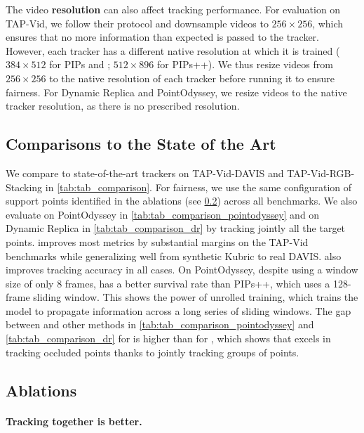The video \textbf{resolution} can also affect tracking performance.
For evaluation on TAP-Vid, we follow their protocol and downsample videos to $256\times 256$, which ensures that no more information than expected is passed to the tracker.
However, each tracker has a different native resolution at which it is trained ($384 \times 512$ for PIPs and \method; $512 \times 896$ for PIPs++).
We thus resize videos from $256\times 256$ to the native resolution of each tracker before running it to ensure fairness.
For Dynamic Replica and PointOdyssey, we resize videos to the native tracker resolution, as there is no prescribed resolution.




\subsection{Comparisons to the State of the Art}%
\label{sec:sota}

We compare \method to state-of-the-art trackers on TAP-Vid-DAVIS and TAP-Vid-RGB-Stacking in \cref{tab:tab_comparison}.
For fairness, we use the same configuration of support points identified in the ablations (see \cref{sec:ablations}) across all benchmarks.
We also evaluate \method on PointOdyssey in \cref{tab:tab_comparison_pointodyssey} and on Dynamic Replica in \cref{tab:tab_comparison_dr} by tracking jointly all the target points.
\method improves most metrics by substantial margins on the TAP-Vid benchmarks while generalizing well from synthetic Kubric to real DAVIS\@.
\method also improves tracking accuracy \davgvis in all cases.
On PointOdyssey, despite using a window size of only 8 frames, \method has a better survival rate than PIPs++, which uses a 128-frame sliding window.
This shows the power of unrolled training, which trains the model to propagate information across a long series of sliding windows.
The gap between \method and other methods in \cref{tab:tab_comparison_pointodyssey} and \cref{tab:tab_comparison_dr} for \davgocc is higher than for \davgvis, which shows that \method excels in tracking occluded points thanks to jointly tracking groups of points.

\subsection{Ablations}%
\label{sec:ablations}

\paragraph{Tracking together is better.}


